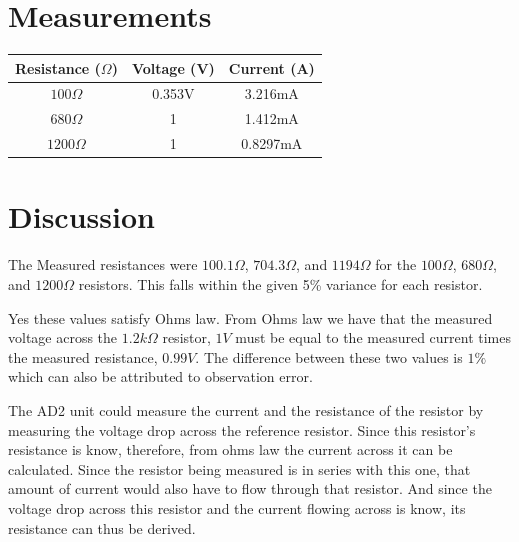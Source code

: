 \documentclass[12pt]{article}
\begin{document}
\section*{Measurements}
\begin{center}
\begin{tabular}{||c|c|c ||}
\hline
Resistance ($\Omega$) & Voltage (V) & Current (A)\\
\hline
\hline
$100\Omega$ &0.353V &3.216mA\\
\hline
$680\Omega$ &1 &1.412mA\\
\hline
$1200\Omega$ &1 &0.8297mA\\
\hline
\end{tabular}
\end{center}

\pagebreak
\section*{Discussion}
The Measured resistances were $100.1\Omega$, $704.3\Omega$, and $1194\Omega$ for the $100\Omega$, $680\Omega$, and $1200\Omega$ resistors. This falls within the given 5\% variance for each resistor.

Yes these values satisfy Ohms law. From Ohms law we have that the measured voltage across the $1.2k\Omega$ resistor, $1V$ must be equal to the measured current times the measured resistance, $0.99V$.   The difference between these two values is $1\%$ which can also be attributed to observation error.

The AD2 unit could measure the current and the resistance of the resistor by measuring the voltage drop across the reference resistor. Since this resistor's resistance is know, therefore, from ohms law the current across it can be calculated. Since the resistor being measured is in series with this one, that amount of current would also have to flow through that resistor. And since the voltage drop across this resistor and the current flowing across is know, its resistance can thus be derived. 
\pagebreak
\end{document}
